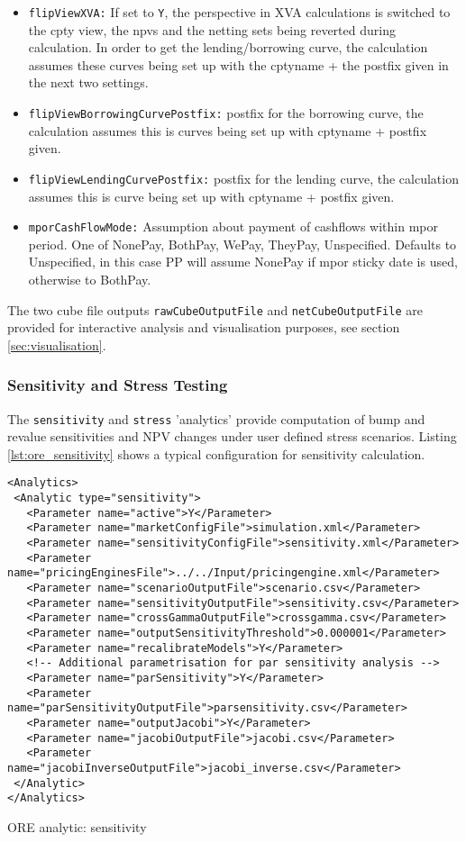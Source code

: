 {\begin{itemize}
\item {\tt flipViewXVA:} If set to {\tt Y}, the perspective in XVA calculations is switched to the cpty view, the npvs and the netting sets being reverted during calculation. In order to get the lending/borrowing curve, the calculation assumes these curves being set up with the cptyname + the postfix given in the next two settings.
\item {\tt flipViewBorrowingCurvePostfix:} postfix for the borrowing curve, the calculation assumes this is curves being set up with cptyname + postfix given.
\item {\tt flipViewLendingCurvePostfix:} postfix for the lending curve, the calculation assumes this is curve being set up with cptyname + postfix given.
\item {\tt mporCashFlowMode:} Assumption about payment of cashflows within mpor period. One of NonePay, BothPay, WePay,
  TheyPay, Unspecified. Defaults to Unspecified, in this case PP will assume NonePay if mpor sticky date is used,
  otherwise to BothPay.
\end{itemize}

The two cube file outputs {\tt rawCubeOutputFile} and {\tt netCubeOutputFile} are provided for interactive analysis and visualisation purposes, see section
\ref{sec:visualisation}.

\subsubsection{Sensitivity and Stress Testing}

The {\tt sensitivity} and {\tt stress} 'analytics' provide computation of bump and revalue
sensitivities and NPV changes under user defined stress scenarios. Listing \ref{lst:ore_sensitivity}
shows a typical configuration for sensitivity calculation.

\begin{listing}[H]
\begin{verbatim}
<Analytics>
 <Analytic type="sensitivity">
   <Parameter name="active">Y</Parameter>
   <Parameter name="marketConfigFile">simulation.xml</Parameter>
   <Parameter name="sensitivityConfigFile">sensitivity.xml</Parameter>
   <Parameter name="pricingEnginesFile">../../Input/pricingengine.xml</Parameter>
   <Parameter name="scenarioOutputFile">scenario.csv</Parameter>
   <Parameter name="sensitivityOutputFile">sensitivity.csv</Parameter>
   <Parameter name="crossGammaOutputFile">crossgamma.csv</Parameter>
   <Parameter name="outputSensitivityThreshold">0.000001</Parameter>
   <Parameter name="recalibrateModels">Y</Parameter>
   <!-- Additional parametrisation for par sensitivity analysis -->
   <Parameter name="parSensitivity">Y</Parameter>
   <Parameter name="parSensitivityOutputFile">parsensitivity.csv</Parameter>
   <Parameter name="outputJacobi">Y</Parameter>
   <Parameter name="jacobiOutputFile">jacobi.csv</Parameter>
   <Parameter name="jacobiInverseOutputFile">jacobi_inverse.csv</Parameter>
 </Analytic>
</Analytics>
\end{verbatim}
\caption{ORE analytic: sensitivity}
\label{lst:ore_sensitivity}
\end{listing}

}
